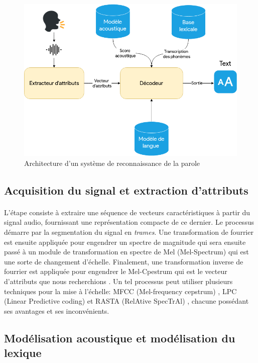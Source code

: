 \begin{figure}[H]
	\centering
	\label{ASRSchema}
	\includegraphics[width=0.70\linewidth]{images/ASR/schema.png}
	\caption{Architecture d'un système de reconnaissance de la parole \citep{speech_reco_Yu2015}}
\end{figure}

\subsection{Acquisition du signal et extraction d'attributs}
\paragraph{}
L'étape consiste à extraire une séquence de vecteurs caractéristiques à partir du signal audio, fournissant une représentation compacte de ce dernier. Le processus démarre par la segmentation du signal en \textit{trames}. Une transformation de fourrier est ensuite appliquée pour engendrer un spectre de magnitude qui sera ensuite passé à un module de transformation en spectre de Mel (Mel-Spectrum) qui est une sorte de changement d'échelle. Finalement, une transformation inverse de fourrier est appliquée pour engendrer le Mel-Cpestrum qui est le vecteur d'attributs que nous recherchions \citep{asr_extraction}. Un tel processus peut utiliser plusieurs techniques pour la mise à l'échelle: MFCC (Mel-frequency cepstrum) \citep{MFCC}, LPC (Linear Predictive coding) \citep{LSP} et RASTA (RelAtive SpecTrAl) \citep{RASTA}, chacune possédant ses avantages et ses inconvénients.
\subsection{Modélisation acoustique et modélisation du lexique}
